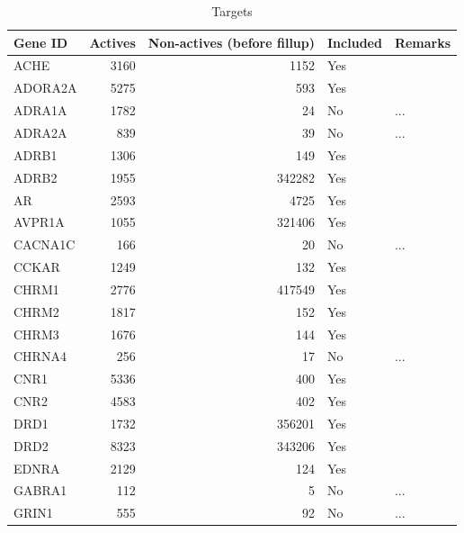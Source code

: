 \documentclass[utf8]{frontiersSCNS} %
\begin{document}
\begin{table}[]
\centering
\caption{Targets}
\label{tbl:targets}
\begin{tabular}{|l|r|r|l|l|}
\hline
    Gene ID & Actives & Non-actives (before fillup) & Included & Remarks \\ \hline
    ACHE    &       3160    &       1152        &   Yes     &       \\
    ADORA2A &       5275    &       593         &   Yes     &       \\
    ADRA1A  &       1782    &       24          &   No      &       ...     \\
    ADRA2A  &       839     &       39          &   No      &       ...     \\
    ADRB1   &       1306    &       149         &   Yes     &       \\
    ADRB2   &       1955    &       342282      &   Yes     &       \\
    AR      &       2593    &       4725        &   Yes     &       \\
    AVPR1A  &       1055    &       321406      &   Yes     &       \\
    CACNA1C &       166     &       20          &   No      &       ...     \\
    CCKAR   &       1249    &       132         &   Yes     &       \\
    CHRM1   &       2776    &       417549      &   Yes     &       \\
    CHRM2   &       1817    &       152         &   Yes     &       \\
    CHRM3   &       1676    &       144         &   Yes     &       \\
    CHRNA4  &       256     &       17          &   No      &       ...     \\
    CNR1    &       5336    &       400         &   Yes     &       \\
    CNR2    &       4583    &       402         &   Yes     &       \\
    DRD1    &       1732    &       356201      &   Yes     &       \\
    DRD2    &       8323    &       343206      &   Yes     &       \\
    EDNRA   &       2129    &       124         &   Yes     &       \\
    GABRA1  &       112     &       5           &   No      &       ...     \\
    GRIN1   &       555     &       92          &   No      &       ...     \\

\end{tabular}
\end{table}
\end{document}
